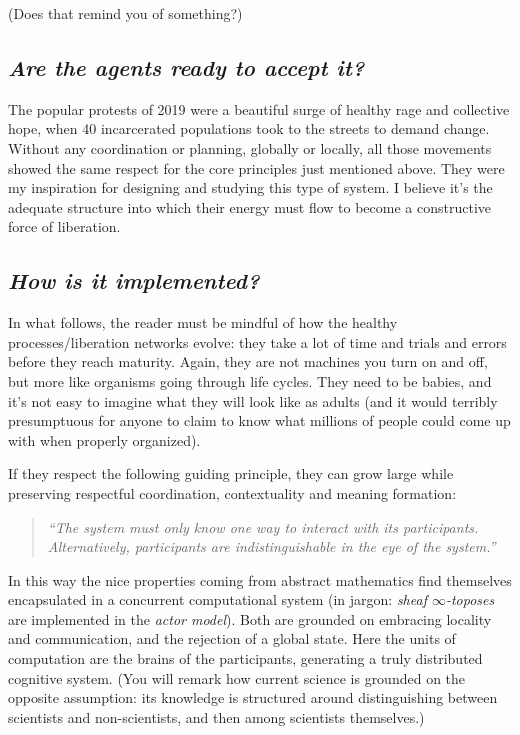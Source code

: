 \documentclass[11pt]{article}
\newenvironment{epigraphquote}
  {\begin{quote}\small\itshape}
  {\end{quote}}
\begin{document}
(Does that remind you of something?)

\subsection*{\emph{Are the agents ready to accept it?}}

The popular protests of 2019 were a beautiful surge of healthy rage and collective hope,
when 40 incarcerated populations took to the streets to demand change. Without any
coordination or planning, globally or locally, all those movements showed the same
respect for the core principles just mentioned above. They were my inspiration for
designing and studying this type of system. I believe it's the adequate structure into
which their energy must flow to become a constructive force of liberation.

\subsection*{\emph{How is it implemented?}}

In what follows, the reader must be mindful of how the healthy processes/liberation
networks evolve: they take a lot of time and trials and errors before they reach
maturity. Again, they are not machines you turn on and off, but more like organisms
going through life cycles. They need to be babies, and it's not easy to imagine what
they will look like as adults (and it would terribly presumptuous for anyone to claim to
know what millions of people could come up with when properly organized).

If they respect the following guiding principle, they can grow large while preserving
respectful coordination, contextuality and meaning formation:

\begin{epigraphquote}
``The system must only know one way to interact with its participants. Alternatively,
participants are indistinguishable in the eye of the system.''
\end{epigraphquote}

In this way the nice properties coming from abstract mathematics find themselves
encapsulated in a concurrent computational system (in jargon: \emph{sheaf
\(\infty\)-toposes} are implemented in the \emph{actor model}). Both are grounded on
embracing locality and communication, and the rejection of a global state. Here the
units of computation are the brains of the participants, generating a truly distributed
cognitive system. (You will remark how current science is grounded on the opposite
assumption: its knowledge is structured around distinguishing between scientists and
non-scientists, and then among scientists themselves.)
\end{document}

